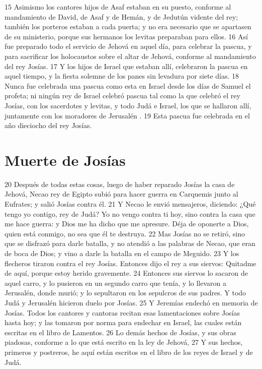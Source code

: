 15 Asimismo los cantores hijos de Asaf estaban en su puesto, conforme al mandamiento de David, de Asaf y de Hemán, y de Jedutún vidente del rey; también los porteros estaban a cada puerta; y no era necesario que se apartasen de su ministerio, porque sus hermanos los levitas preparaban para ellos.
16 Así fue preparado todo el servicio de Jehová en aquel día, para celebrar la pascua, y para sacrificar los holocaustos sobre el altar de Jehová, conforme al mandamiento del rey Josías.
17 Y los hijos de Israel que estaban allí, celebraron la pascua en aquel tiempo, y la fiesta solemne de los panes sin levadura por siete días. 
18 Nunca fue celebrada una pascua como esta en Israel desde los días de Samuel el profeta; ni ningún rey de Israel celebró pascua tal como la que celebró el rey Josías, con los sacerdotes y levitas, y todo Judá e Israel, los que se hallaron allí, juntamente con los moradores de Jerusalén .
19 Esta pascua fue celebrada en el año dieciocho del rey Josías.

\section*{Muerte de Josías}

20 Después de todas estas cosas, luego de haber reparado Josías la casa de Jehová, Necao rey de Egipto subió para hacer guerra en Carquemis junto al Eufrates; y salió Josías contra él.
21 Y Necao le envió mensajeros, diciendo: ¿Qué tengo yo contigo, rey de Judá? Yo no vengo contra ti hoy, sino contra la casa que me hace guerra: y Dios me ha dicho que me apresure. Déja de oponerte a Dios, quien está conmigo, no sea que él te destruya.
22 Mas Josías no se retiró, sino que se disfrazó para darle batalla, y no atendió a las palabras de Necao, que eran de boca de Dios; y vino a darle la batalla en el campo de Meguido.
23 Y los flecheros tiraron contra el rey Josías. Entonces dijo el rey a sus siervos: Quitadme de aquí, porque estoy herido gravemente.
24 Entonces sus siervos lo sacaron de aquel carro, y lo pusieron  en un segundo carro que tenía, y lo llevaron a Jerusalén, donde murió; y lo sepultaron en los sepulcros de sus padres. Y todo Judá y Jerusalén  hicieron duelo por Josías.
25 Y Jeremías endechó en memoria de Josías. Todos los cantores y cantoras recitan esas lamentaciones sobre Josías hasta hoy; y las tomaron por norma para endechar en Israel, las cuales están escritas en el libro de Lamentos.
26 Lo demás hechos de Josías, y sus obras piadosas, conforme a lo que está escrito en la ley de Jehová,
27 Y sus hechos, primeros y postreros, he aquí están escritos en el libro de los reyes de Israel y de Judá.

